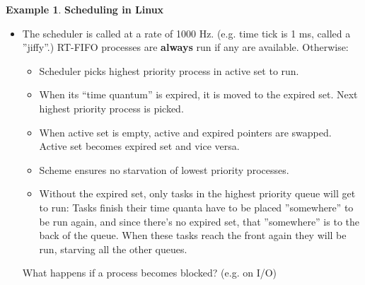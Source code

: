 \documentclass[12pt,a4paper]{article}
\theoremstyle{definition}
\newtheorem{example}{Example}[section]
\newenvironment{myitemize}
{ \begin{itemize}
    \setlength{\itemsep}{5pt}
    \setlength{\parskip}{0pt}
    \setlength{\parsep}{0pt}     }
{ \end{itemize}                  }
\begin{document}
\begin{example}{\textbf{Scheduling in Linux}}
\begin{myitemize}
		\item The scheduler is called at a rate of 1000 Hz. (e.g. time tick is 1 ms, called a ''jiffy''.) \textsf{RT-FIFO} processes are \textbf{always} run if any are available. Otherwise:
		\begin{myitemize}
			\item Scheduler picks highest priority process in active set to run.
			\item When its “time quantum” is expired, it is moved to the expired set. Next highest priority process is picked.
			\item When active set is empty, active and expired pointers are swapped. Active set becomes expired set and vice versa.
			\item Scheme ensures no starvation of lowest priority processes.
			\item Without the expired set, only tasks in the highest priority queue will get to run: Tasks finish their time quanta have to be placed ''somewhere'' to be run again, and since there’s no expired set, that ''somewhere'' is to the back of the queue. When these tasks reach the front again they will be run, starving all the other queues.
		\end{myitemize}
		\begin{tcolorbox}
			\textsf{What happens if a process becomes blocked? (e.g. on I/O)}
			

\end{tcolorbox}
\end{myitemize}
\end{example}
\end{document}
